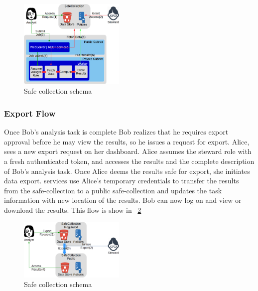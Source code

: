 \begin{figure}
  \center
  \includegraphics[width=0.45\textwidth]{figures/safe_flow.png}
  \caption{Safe collection schema}
  \label{fig:flow1}
  \vspace{-1.5em}
\end{figure}


\subsubsection{Export Flow}

Once Bob's analysis task is complete Bob realizes that he requires export approval before he may view the
results, so he issues a request for export. Alice, sees a new export request on her dashboard. Alice assumes
the steward role with a fresh authenticated token, and accesses the results and the complete description
of Bob's analysis task. Once Alice deems the results safe for export, she initiates data export. \NAME
services use Alice's temporary credentials to transfer the results from the safe-collection to a public
safe-collection and updates the task information with new location of the results. Bob can now log on
and view or download the results. This flow is show in \figurename~\ref{fig:flow2}

\begin{figure}
  \center
  \includegraphics[width=0.45\textwidth]{figures/export_flow.png}
  \caption{Safe collection schema}
  \label{fig:flow2}
  \vspace{-1.5em}
\end{figure}









